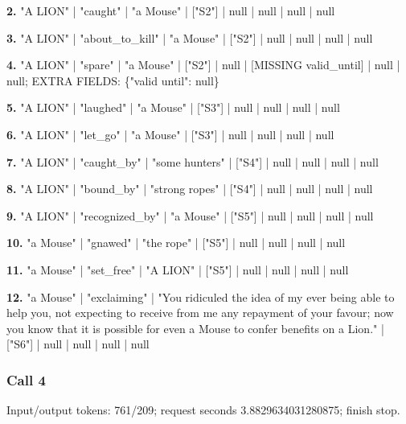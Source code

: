 \noindent\textbf{2.} "A LION" | "caught" | "a Mouse" | ["S2"] | null | null | null | null\par\smallskip

\noindent\textbf{3.} "A LION" | "about\_to\_kill" | "a Mouse" | ["S2"] | null | null | null | null\par\smallskip

\noindent\textbf{4.} "A LION" | "spare" | "a Mouse" | ["S2"] | null | [MISSING valid\_until] | null | null; EXTRA FIELDS: \{"valid until": null\}\par\smallskip

\noindent\textbf{5.} "A LION" | "laughed" | "a Mouse" | ["S3"] | null | null | null | null\par\smallskip

\noindent\textbf{6.} "A LION" | "let\_go" | "a Mouse" | ["S3"] | null | null | null | null\par\smallskip

\noindent\textbf{7.} "A LION" | "caught\_by" | "some hunters" | ["S4"] | null | null | null | null\par\smallskip

\noindent\textbf{8.} "A LION" | "bound\_by" | "strong ropes" | ["S4"] | null | null | null | null\par\smallskip

\noindent\textbf{9.} "A LION" | "recognized\_by" | "a Mouse" | ["S5"] | null | null | null | null\par\smallskip

\noindent\textbf{10.} "a Mouse" | "gnawed" | "the rope" | ["S5"] | null | null | null | null\par\smallskip

\noindent\textbf{11.} "a Mouse" | "set\_free" | "A LION" | ["S5"] | null | null | null | null\par\smallskip

\noindent\textbf{12.} "a Mouse" | "exclaiming" | "You ridiculed the idea of my ever being able to help you, not expecting to receive from me any repayment of your favour; now you know that it is possible for even a Mouse to confer benefits on a Lion." | ["S6"] | null | null | null | null\par\smallskip

\subsubsection*{Call 4}

Input/output tokens: 761/209; request seconds 3.8829634031280875; finish stop.

